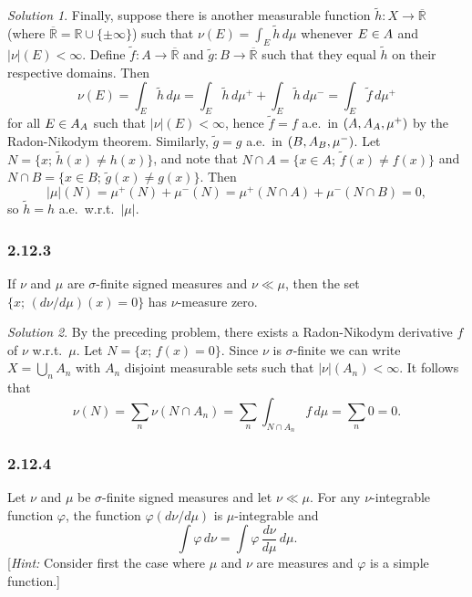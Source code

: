 \documentclass{report}
\newcommand{\bb}[1]{\mathbb{#1}}
\let\cal\relax
\newcommand{\cal}[1]{\mathcal{#1}}
\theoremstyle{remark}
\newtheorem*{solution}{Solution}
\begin{document}
\begin{solution}
  Finally, suppose there is another measurable function $\tilde h: X \to \overline{\bb R}$ (where $\overline{\bb R} = \bb R \cup \{\pm \infty\}$) such that $\nu(E) = \int_E \tilde h \, d\mu$ whenever $E \in \cal A$ and $|\nu|(E) < \infty$. Define $\tilde f: A \to \overline{\bb R}$ and $\tilde g: B \to \overline{\bb R}$ such that they equal $\tilde h$ on their respective domains. Then
  \begin{equation*}
    \nu(E) = \int_E \tilde h \, d\mu = \int_E \tilde h \, d\mu^+ + \int_E \tilde h \, d\mu^- = \int_E \tilde f \, d\mu^+
  \end{equation*}
  for all $E \in \cal A_A$ such that $|\nu|(E) < \infty$, hence $\tilde f = f$ a.e.\ in $(A, \cal A_A, \mu^+)$ by the Radon-Nikodym theorem. Similarly, $\tilde g = g$ a.e.\ in $(B, \cal A_B, \mu^-)$. Let $N = \{x; \, \tilde h(x) \ne h(x)\}$, and note that $N \cap A = \{x \in A; \, \tilde f(x) \ne f(x)\}$ and $N \cap B = \{x \in B; \, \tilde g(x) \ne g(x)\}$. Then
  \begin{equation*}
    |\mu|(N) = \mu^+(N) + \mu^-(N) = \mu^+(N \cap A) + \mu^-(N \cap B) = 0,
  \end{equation*}
  so $\tilde h = h$ a.e.\ w.r.t.\ $|\mu|$.
\end{solution}

\subsubsection*{2.12.3}
If $\nu$ and $\mu$ are $\sigma$-finite signed measures and $\nu \ll \mu$, then the set $\{x; \, (d\nu/d\mu)(x) = 0\}$ has $\nu$-measure zero.

\begin{solution}
  By the preceding problem, there exists a Radon-Nikodym derivative $f$ of $\nu$ w.r.t.\ $\mu$. Let $N = \{x; \, f(x) = 0\}$. Since $\nu$ is $\sigma$-finite we can write $X = \bigcup_n A_n$ with $A_n$ disjoint measurable sets such that $|\nu|(A_n) < \infty$. It follows that
  \begin{equation*}
    \nu(N) = \sum_n \nu(N \cap A_n) = \sum_n \int_{N \cap A_n} f \, d\mu = \sum_n 0 = 0.
  \end{equation*}
\end{solution}

\subsubsection*{2.12.4}
Let $\nu$ and $\mu$ be $\sigma$-finite signed measures and let $\nu \ll \mu$. For any $\nu$-integrable function $\varphi$, the function $\varphi (d\nu/d\mu)$ is $\mu$-integrable and
\begin{equation*}
  \int \varphi \, d\nu = \int \varphi \, \frac{d\nu}{d\mu} \, d\mu.
\end{equation*}
[\emph{Hint:} Consider first the case where $\mu$ and $\nu$ are measures and $\varphi$ is a simple function.]
\end{document}

